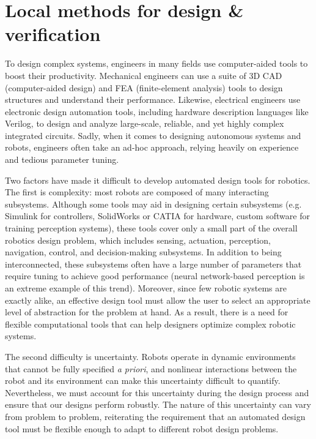 
\section{Local methods for design \& verification}\label{section:local_methods}

To design complex systems, engineers in many fields use computer-aided tools to boost their productivity. Mechanical engineers can use a suite of 3D CAD (computer-aided design) and FEA (finite-element analysis) tools to design structures and understand their performance. Likewise, electrical engineers use electronic design automation tools, including hardware description languages like Verilog, to design and analyze large-scale, reliable, and yet highly complex integrated circuits. Sadly, when it comes to designing autonomous systems and robots, engineers often take an ad-hoc approach, relying heavily on experience and tedious parameter tuning.

Two factors have made it difficult to develop automated design tools for robotics. The first is complexity: most robots are composed of many interacting subsystems. Although some tools may aid in designing certain subsystems (e.g. Simulink for controllers, SolidWorks or CATIA for hardware, custom software for training perception systems), these tools cover only a small part of the overall robotics design problem, which includes sensing, actuation, perception, navigation, control, and decision-making subsystems. In addition to being interconnected, these subsystems often have a large number of parameters that require tuning to achieve good performance (neural network-based perception is an extreme example of this trend). Moreover, since few robotic systems are exactly alike, an effective design tool must allow the user to select an appropriate level of abstraction for the problem at hand. As a result, there is a need for flexible computational tools that can help designers optimize complex robotic systems.

The second difficulty is uncertainty. Robots operate in dynamic environments that cannot be fully specified \textit{a priori}, and nonlinear interactions between the robot and its environment can make this uncertainty difficult to quantify. Nevertheless, we must account for this uncertainty during the design process and ensure that our designs perform robustly. The nature of this uncertainty can vary from problem to problem, reiterating the requirement that an automated design tool must be flexible enough to adapt to different robot design problems.


